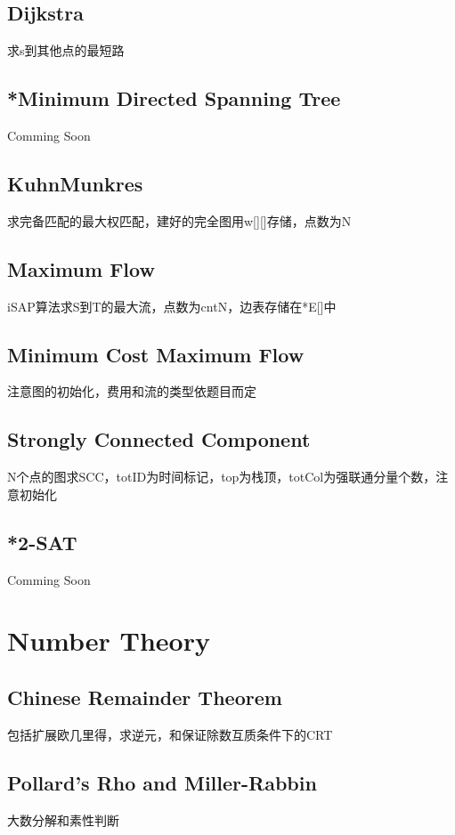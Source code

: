 \documentclass[a4paper,10pt]{report}
\begin{document}
	\section{Dijkstra}
	求s到其他点的最短路
	

	\section{*Minimum Directed Spanning Tree}
	Comming Soon

	\section{KuhnMunkres}
	求完备匹配的最大权匹配，建好的完全图用w[][]存储，点数为N
	

	\section{Maximum Flow}
	iSAP算法求S到T的最大流，点数为cntN，边表存储在*E[]中
	

	\section{Minimum Cost Maximum Flow}
	注意图的初始化，费用和流的类型依题目而定
	

	\section{Strongly Connected Component}
	N个点的图求SCC，totID为时间标记，top为栈顶，totCol为强联通分量个数，注意初始化
	
	
	\section{*2-SAT}
	Comming Soon

\chapter{Number Theory}
	\section{Chinese Remainder Theorem}
	包括扩展欧几里得，求逆元，和保证除数互质条件下的CRT
	

	\section{Pollard's Rho and Miller-Rabbin}
	大数分解和素性判断
	
	
\end{document}
